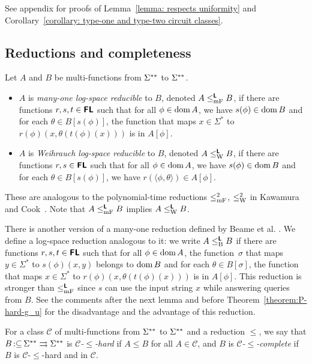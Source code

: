 \documentclass[envcountsect,envcountsame,orivec,oribibl]{llncs}
\newcommand{\pcolon}{\mathpunct{\,:\subseteq}}
\begin{document}
See appendix for proofs of 
Lemma~\ref{lemma: respects uniformity} and 
Corollary~\ref{corollary: type-one and type-two circuit classes}.

\subsection{Reductions and completeness}

\begin{definition}
Let $A$ and $B$ be multi-functions from $\Sigma ^{**}$ to $\Sigma ^{**}$.
\begin{itemize}
 \item $A$ is \emph{many-one log-space reducible} to $B$, 
       denoted $A \leq _{\mathrm{mF}} ^{\text{\bfseries \sffamily \upshape L}} B$,
       if there are functions $r, s, t \in \text{\bfseries \sffamily \upshape FL}$ such that 
       for all $\phi \in \mathop{\rm dom} A$,
       we have $s(\phi) \in \mathop{\rm dom} B$ and 
       for each $\theta \in B[s(\phi)]$, 
       the function that maps $x \in \Sigma^*$ to $r(\phi)(x, \theta(t(\phi)(x)))$
       is in $A[\phi]$.
 \item $A$ is \emph{Weihrauch log-space reducible} to $B$,
       denoted $A \leq _{\mathrm W} ^{\text{\bfseries \sffamily \upshape L}} B$,
       if there are functions $r, s \in \text{\bfseries \sffamily \upshape FL}$ such that 
       for all $\phi \in \mathop{\rm dom} A$,
       we have $s(\phi) \in \mathop{\rm dom} B$ and 
       for each $\theta \in B[s(\phi)]$, 
       we have $r(\langle \phi, \theta \rangle) \in A[\phi]$.
\end{itemize}
\end{definition}

These are analogous to the polynomial-time reductions 
$\leq _{\mathrm{mF}}^2$, $\leq _{\mathrm W}^2$ in Kawamura and Cook~\cite{kawamura2012complexity}.
Note that $A \leq _{\mathrm{mF}} ^{\text{\bfseries \sffamily \upshape L}} B$ implies $A \leq _{\mathrm W} ^{\text{\bfseries \sffamily \upshape L}} B$.

There is another version of a many-one reduction defined by
Beame et al. \cite{beame1995relative}.
We define a log-space reduction analogous to it:
we write $A \leq _{\mathrm B} ^{\text{\bfseries \sffamily \upshape L}} B$ 
if there are functions $r, s, t \in \text{\bfseries \sffamily \upshape FL}$ such that 
for all $\phi \in \mathop{\rm dom} A$,
the function~$\sigma$ that maps $y \in \Sigma ^*$ to $s (\phi) (x, y)$
belongs to $\mathop{\rm dom} B$ 
and for each $\theta \in B [\sigma]$, 
the function that maps $x \in \Sigma^*$ 
to $r(\phi)(x, \theta(t(\phi)(x)))$ is in $A[\phi]$.
This reduction is stronger than $\leq _{\mathrm{mF}} ^{\text{\bfseries \sffamily \upshape L}}$ since
$s$ can use the input string $x$ while answering queries from $B$.
See the comments after the next lemma and before Theorem~\ref{theorem:P-hard-g_u} for
the disadvantage and the advantage of this reduction.

For a class $\mathcal{C}$ of multi-functions from $\Sigma ^{**}$ to $\Sigma ^{**}$
and a reduction $\leq$, 
we say that $B \pcolon \LM \rightrightarrows \LM$ is 
\emph{$\mathcal{C}$-$\leq$-hard} if $A \leq B$ for all $A \in \mathcal{C}$,
and $B$ is \emph{$\mathcal{C}$-$\leq$-complete} 
if $B$ is $\mathcal{C}$-$\leq$-hard and in $\mathcal{C}$.
\end{document}
